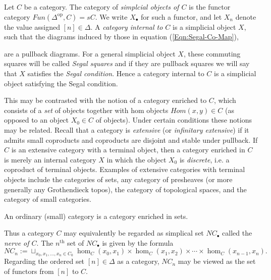 \documentclass{amsart}
\begin{document}
Let $C$ be a category. The category of {\em simplcial objects of $C$} is the functor category $Fun(\Delta^\textrm{op}, C) = sC$. We write $X_\bullet$ for such a functor, and let $X_n$ denote the value assigned $[n] \in \Delta$. A {\em category internal to $C$} is a simplicial object $X$, such that the diagrams induced by those in equation (\ref{Eqn:Segal-Co-Map}),
\begin{center}
\end{center}
are a pullback diagrams. For a general simplicial object $X$, these commuting squares will be called {\em Segal squares} and if they are pullback squares we will say that $X$ satisfies the {\em Segal condition}. Hence a category internal to $C$ is a simplicial object satisfying the Segal condition. 

This may be contrasted with the notion of a category enriched to $C$, which consists of a {\em set} of objects together with hom objects $Hom(x,y) \in C$ (as opposed to an object $X_0 \in C$ of objects). Under certain conditions these notions may be related. Recall that a category is {\em extensive} (or {\em infinitary extensive}) if it admits small coproducts and coproducts are disjoint and stable under pullback. If $C$ is an extensive category with a terminal object, then a category enriched in $C$ is merely an internal category $X$ in which the object $X_0$ is {\em discrete}, i.e. a coproduct of terminal objects. Examples of extensive categories with terminal objects include the categories of sets, any category of presheaves (or more generally any Grothendieck topos), the category of topological spaces, and the category of small categories. 

\begin{example}
	An ordinary (small) category is a category enriched in sets.
\end{example}

Thus a category $C$ may equivalently be regarded as simplical set $NC_\bullet$ called the {\em nerve of $C$}. The $n^\textrm{th}$ set of $NC_{\bullet}$ is given by the formula
\begin{equation*}
	NC_n := \sqcup_{x_0, x_1, \dots, x_n \in C_0} \hom_C(x_0, x_1) \times \hom_C(x_1, x_2) \times \cdots \times \hom_C(x_{n-1}, x_n).
\end{equation*}
Regarding the ordered set $[n] \in \Delta$ as a category, $NC_n$ may be viewed as the set of functors from $[n]$ to $C$. 
\end{document}
